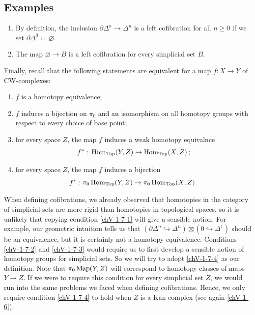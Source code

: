     \subsection{Examples}
        \begin{enumerate}[label=\roman*)]
            \item 
                By definition, the inclusion $\partial \Delta^n \to \Delta^n$ is a left cofibration for all $n \geq 0$ if we set $\partial \Delta^0 \coloneq \varnothing$.
            \item 
                The map $\varnothing \to B$ is a left cofibration for every simplicial set $B$.
        \end{enumerate}
        Finally, recall that the following statements are equivalent for a map $f \colon X \to Y$ of CW-complexes:
        \begin{enumerate}[label=\roman*)]
            \item 
                $f$ is a homotopy equivalence;\label{chV-1-7-1}
            \item 
                $f$ induces a bijection on $\pi_0$ and an isomorphism on all homotopy groups with respect to every choice of base point;\label{chV-1-7-2}
            \item 
                for every space $Z$, the map $f$ induces a weak homotopy equivalnce
                \begin{equation*}
                    f^{*} \,\colon \operatorname{Hom}_{\operatorname{Top}}(Y, Z) \to \operatorname{Hom}_{\operatorname{Top}}(X, Z) \,;
                    \end{equation*}\label{chV-1-7-3}
            \item 
                for every space $Z$, the map $f$ induces a bijection
                \begin{equation*}
                    f^* \,\colon \pi_0 \operatorname{Hom}_{\operatorname{Top}}(Y, Z) \to \pi_0 \operatorname{Hom}_{\operatorname{Top}}(X, Z) \,.
                \end{equation*}\label{chV-1-7-4}
        \end{enumerate}
        When defining cofibrations, we already observed that homotopies in the category of simplicial sets are more rigid than homotopies in topological spaces, so it is unlikely that copying condition \ref{chV-1-7-1} will give a sensible notion. For example, our geometric intuition tells us that $(\partial \Delta^n \hookrightarrow \Delta^n) \boxtimes ({0} \hookrightarrow \Delta^1)$ should be an equivalence, but it is certainly not a homotopy equivalence. Conditions \ref{chV-1-7-2} and \ref{chV-1-7-3} would require us to first develop a sensible notion of homotopy groups for simplicial sets. So we will try to adopt \ref{chV-1-7-4} as our definition. Note that $\pi_0\operatorname{Map}(Y, Z)$ will correspond to homotopy classes of maps $Y \to Z$. If we were to require this condition for every simplicial set $Z$, we would run into the same problems we faced when defining cofibrations. Hence, we only require condition \ref{chV-1-7-4} to hold when $Z$ is a Kan complex (see again \ref{chV-1-6}).

